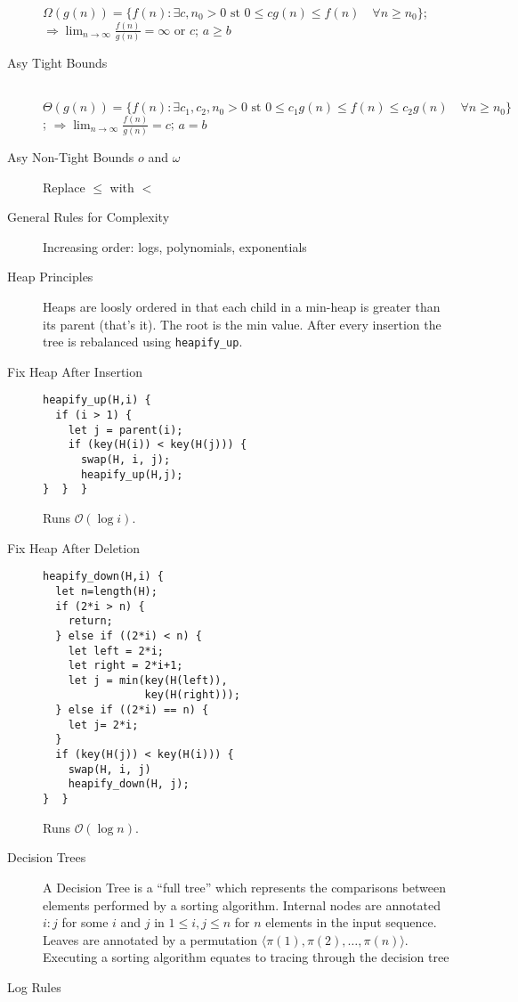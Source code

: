 \documentclass[8pt]{article}
\begin{document}
\begin{multicols}{2}
\begin{description}
    $\Omega(g(n))=\{f(n): \exists c,n_0>0 \text{ st } 0 \le cg(n) \le
    f(n) \quad\forall n \ge n_0\}$; $\Rightarrow
    \lim_{n\rightarrow\infty}\frac{f(n)}{g(n)} = \infty \text{ or }
    c$;
    $a \ge b$
  \item[Asy Tight Bounds] \hfill\\
    $\Theta(g(n))=\{f(n): \exists c_1,c_2,n_0>0 \text{ st } 0 \le
    c_1g(n) \le f(n) \le c_2g(n) \quad\forall n \ge n_0\}$;
    $\Rightarrow \lim_{n\rightarrow\infty}\frac{f(n)}{g(n)} = c$;
    $a = b$
  \item[Asy Non-Tight Bounds $o$ and $\omega$] Replace $\le$ with $<$
  \item[General Rules for Complexity] Increasing order:
    logs, polynomials, exponentials
  \item[Heap Principles] Heaps are loosly ordered in that each child
    in a min-heap is greater than its parent (that's it). The root is
    the min value. After every insertion the tree is rebalanced using
    \texttt{heapify\_up}.
  \item[Fix Heap After Insertion] \hfill
\begin{verbatim}
heapify_up(H,i) {
  if (i > 1) {
    let j = parent(i);
    if (key(H(i)) < key(H(j))) {
      swap(H, i, j);
      heapify_up(H,j);
}  }  }
\end{verbatim}
    Runs $\mathcal{O}(\log i)$.
  \item[Fix Heap After Deletion] \hfill
\begin{verbatim}
heapify_down(H,i) {
  let n=length(H);
  if (2*i > n) {
    return;
  } else if ((2*i) < n) {
    let left = 2*i;
    let right = 2*i+1;
    let j = min(key(H(left)),
                key(H(right)));
  } else if ((2*i) == n) {
    let j= 2*i;
  }
  if (key(H(j)) < key(H(i))) {
    swap(H, i, j)
    heapify_down(H, j);
}  }
\end{verbatim}
    Runs $\mathcal{O}(\log n)$.
  \item[Decision Trees] A Decision Tree is a ``full tree'' which
    represents the comparisons between elements performed by a sorting
    algorithm. Internal nodes are annotated $i:j$ for some $i$ and $j$
    in $1 \le i, j \le n$ for $n$ elements in the input
    sequence. Leaves are annotated by a permutation $\langle \pi(1),
    \pi(2), \ldots, \pi(n)\rangle$. Executing a sorting algorithm
    equates to tracing through the decision tree
  \item[Log Rules] 
    \begin{equation*}
      \begin{aligned}

\end{aligned}
\end{equation*}
\end{description}
\end{multicols}
\end{document}
